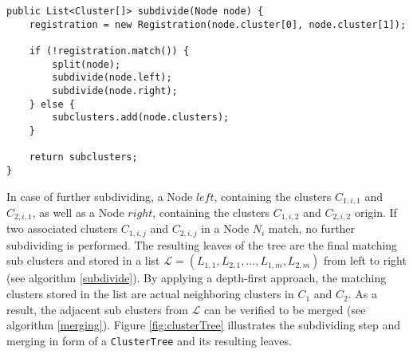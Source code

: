 \begin{lstlisting}
public List<Cluster[]> subdivide(Node node) {
	registration = new Registration(node.cluster[0], node.cluster[1]);

	if (!registration.match()) {
		split(node);
		subdivide(node.left);
		subdivide(node.right);
	} else {
		subclusters.add(node.clusters);
	}

	return subclusters;
}
\end{lstlisting}
In case of further subdividing, a Node $\mathit{left}$, containing the clusters $C_{1,i,1}$ and $C_{2,i,1}$, as well as a Node $\mathit{right}$, containing the clusters $C_{1,i,2}$ and $C_{2,i,2}$ origin. If two associated clusters $C_{1,i,j}$ and $C_{2,i,j}$ in a Node $N_i$ match, no further subdividing is performed. The resulting leaves of the tree are the final matching sub clusters and stored in a list $\mathcal{L} = (L_{1,1},L_{2,1},\ldots,L_{1,m},L_{2,m})$ from left to right (see algorithm \ref{subdivide}). By applying a depth-first approach, the matching clusters stored in the list are  actual neighboring clusters in $C_1$ and $C_2$. As a result, the adjacent sub clusters from $\mathcal{L}$ can be verified to be merged (see algorithm \ref{merging}). Figure \ref{fig:clusterTree} illustrates the subdividing step and merging in form of a \texttt{ClusterTree} and its resulting leaves.
